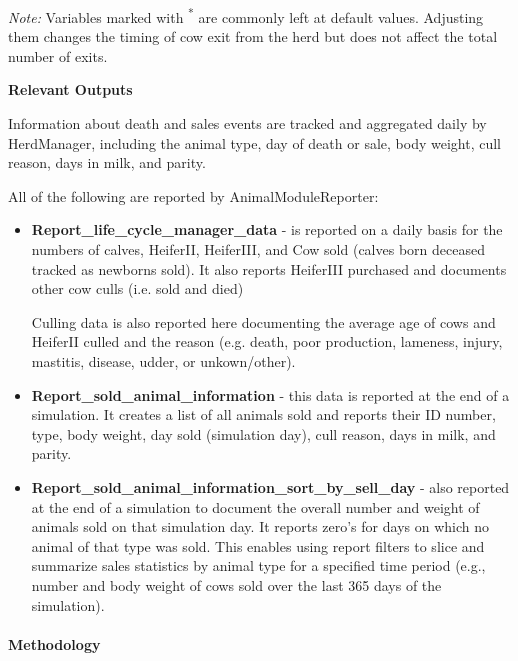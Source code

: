 \documentclass{article}
\begin{document}
\begin{refsection}
\begin{landscape}
\vspace{0.2cm}

{\footnotesize \textit{Note:} Variables marked with \textsuperscript{*} are commonly left at default values. Adjusting them changes the timing of cow exit from the herd but does not affect the total number of exits.}

\end{landscape}




\textbf{Relevant Outputs} 

Information about death and sales events are tracked and aggregated daily by HerdManager, including the animal type, day of death or sale, body weight, cull reason, days in milk, and parity. 
    
All of the following are reported by AnimalModuleReporter: 
\begin{itemize}
    \item \textbf{Report\_life\_cycle\_manager\_data} - is reported on a daily basis for the numbers of calves, HeiferII, HeiferIII, and Cow sold (calves born deceased tracked as newborns sold). It also reports HeiferIII purchased and documents other cow culls (i.e. sold and died)

    Culling data is also reported here documenting the average age of cows and HeiferII culled and the reason (e.g. death, poor production, lameness, injury, mastitis, disease, udder, or unkown/other).


    \item \textbf{Report\_sold\_animal\_information} - this data is reported at the end of a simulation. It creates a list of all animals sold and reports their ID number, type, body weight, day sold (simulation day), cull reason, days in milk, and parity. 

    \item \textbf{Report\_sold\_animal\_information\_sort\_by\_sell\_day} - also reported at the end of a simulation to document the overall number and weight of animals sold on that simulation day. It reports zero's for days on which no animal of that type was sold. This enables using report filters to slice and summarize sales statistics by animal type for a specified time period (e.g., number and body weight of cows sold over the last 365 days of the simulation).
\end{itemize}  

    
\paragraph{Methodology}
\vspace{0.2cm}



\end{refsection}
\end{document}
